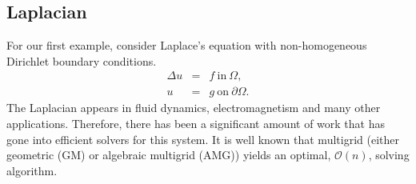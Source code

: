 \documentclass[11pt]{article}
\begin{document}
\subsection{Laplacian}

For our first example, consider Laplace's equation with non-homogeneous Dirichlet boundary conditions.
\begin{equation} \label{eq:Lapl}
    \begin{array}{rcl}
        \Delta u &=& f \ \mbox{in} \ \Omega,\\
        u &=& g \ \mbox{on} \ \partial\Omega.
    \end{array}
\end{equation}
The Laplacian appears in fluid dynamics, electromagnetism and many other applications. Therefore, there has been a significant amount of work that has gone into efficient solvers for this system. It is well known that multigrid (either geometric (GM) or algebraic multigrid (AMG)) yields an optimal, $\mathcal{O}(n)$, solving algorithm.
\end{document}
